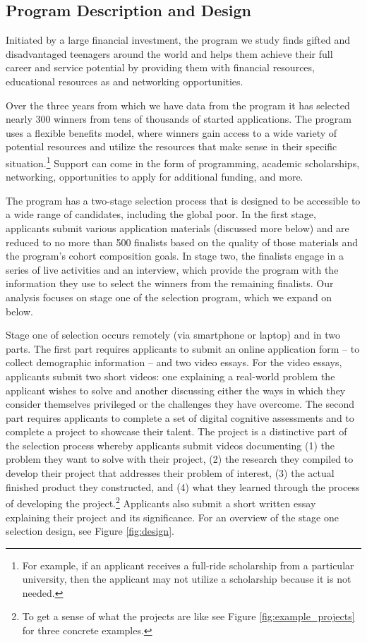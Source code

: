 \subsection{Program Description and Design} \label{subsec:program_design}

Initiated by a large financial investment, the program we study finds gifted and disadvantaged teenagers around the world and helps them achieve their full career and service potential by providing them with financial resources, educational resources as and networking opportunities. 

Over the three years from which we have data from the program it has selected nearly 300 winners from tens of thousands of started applications. The program uses a flexible benefits model, where winners gain access to a wide variety of potential resources and utilize the resources that make sense in their specific situation.\footnote{For example, if an applicant receives a full-ride scholarship from a particular university, then the applicant may not utilize a scholarship because it is not needed.} Support can come in the form of programming, academic scholarships, networking, opportunities to apply for additional funding, and more.

The program has a two-stage selection process that is designed to be accessible to a wide range of candidates, including the global poor. In the first stage, applicants submit various application materials (discussed more below) and are reduced to no more than 500 finalists based on the quality of those materials and the program's cohort composition goals. In stage two, the finalists engage in a series of live activities and an interview, which provide the program with the information they use to select the winners from the remaining finalists. Our analysis focuses on stage one of the selection program, which we expand on below.

Stage one of selection occurs remotely (via smartphone or laptop) and in two parts. The first part requires applicants to submit an online application form -- to collect demographic information -- and two video essays. For the video essays, applicants submit two short videos: one explaining a real-world problem the applicant wishes to solve and another discussing either the ways in which they consider themselves privileged or the challenges they have overcome. The second part requires applicants to complete a set of digital cognitive assessments and to complete a project to showcase their talent. The project is a distinctive part of the selection process whereby applicants submit videos documenting (1) the problem they want to solve with their project, (2) the research they compiled to develop their project that addresses their problem of interest, (3) the actual finished product they constructed, and (4) what they learned through the process of developing the project.\footnote{To get a sense of what the projects are like see Figure \ref{fig:example_projects} for three concrete examples.} Applicants also submit a short written essay explaining their project and its significance. For an overview of the stage one selection design, see Figure \ref{fig:design}.  


